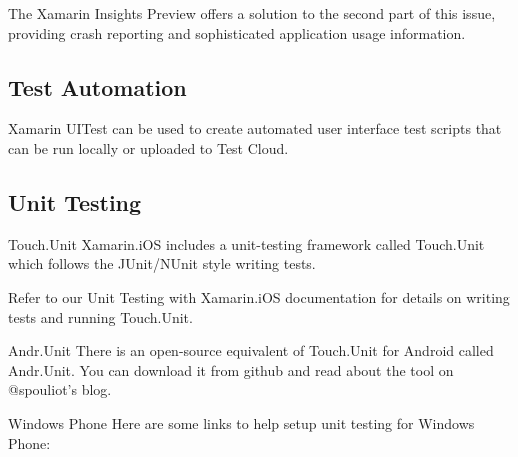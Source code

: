 The Xamarin Insights Preview offers a solution to the second part of this issue, providing crash reporting and sophisticated application usage information.


\subsection{Test Automation}
Xamarin UITest can be used to create automated user interface test scripts that can be run locally or uploaded to Test Cloud.


\subsection{Unit Testing}

Touch.Unit
Xamarin.iOS includes a unit-testing framework called Touch.Unit which follows the JUnit/NUnit style writing tests.

Refer to our Unit Testing with Xamarin.iOS documentation for details on writing tests and running Touch.Unit.


Andr.Unit
There is an open-source equivalent of Touch.Unit for Android called Andr.Unit. You can download it from github and read about the tool on @spouliot's blog.


Windows Phone
Here are some links to help setup unit testing for Windows Phone:
